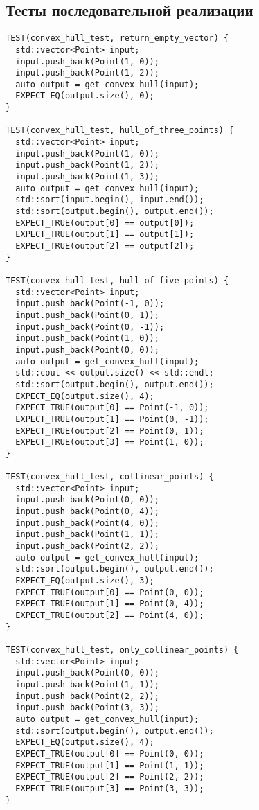 \documentclass[14pt, a4paper]{extarticle}
\begin{document}
\subsection{Тесты последовательной реализации }

\begin{lstlisting}
TEST(convex_hull_test, return_empty_vector) {
  std::vector<Point> input;
  input.push_back(Point(1, 0));
  input.push_back(Point(1, 2));
  auto output = get_convex_hull(input);
  EXPECT_EQ(output.size(), 0);
}

TEST(convex_hull_test, hull_of_three_points) {
  std::vector<Point> input;
  input.push_back(Point(1, 0));
  input.push_back(Point(1, 2));
  input.push_back(Point(1, 3));
  auto output = get_convex_hull(input);
  std::sort(input.begin(), input.end());
  std::sort(output.begin(), output.end());
  EXPECT_TRUE(output[0] == output[0]);
  EXPECT_TRUE(output[1] == output[1]);
  EXPECT_TRUE(output[2] == output[2]);
}

TEST(convex_hull_test, hull_of_five_points) {
  std::vector<Point> input;
  input.push_back(Point(-1, 0));
  input.push_back(Point(0, 1));
  input.push_back(Point(0, -1));
  input.push_back(Point(1, 0));
  input.push_back(Point(0, 0));
  auto output = get_convex_hull(input);
  std::cout << output.size() << std::endl;
  std::sort(output.begin(), output.end());
  EXPECT_EQ(output.size(), 4);
  EXPECT_TRUE(output[0] == Point(-1, 0));
  EXPECT_TRUE(output[1] == Point(0, -1));
  EXPECT_TRUE(output[2] == Point(0, 1));
  EXPECT_TRUE(output[3] == Point(1, 0));
}

TEST(convex_hull_test, collinear_points) {
  std::vector<Point> input;
  input.push_back(Point(0, 0));
  input.push_back(Point(0, 4));
  input.push_back(Point(4, 0));
  input.push_back(Point(1, 1));
  input.push_back(Point(2, 2));
  auto output = get_convex_hull(input);
  std::sort(output.begin(), output.end());
  EXPECT_EQ(output.size(), 3);
  EXPECT_TRUE(output[0] == Point(0, 0));
  EXPECT_TRUE(output[1] == Point(0, 4));
  EXPECT_TRUE(output[2] == Point(4, 0));
}

TEST(convex_hull_test, only_collinear_points) {
  std::vector<Point> input;
  input.push_back(Point(0, 0));
  input.push_back(Point(1, 1));
  input.push_back(Point(2, 2));
  input.push_back(Point(3, 3));
  auto output = get_convex_hull(input);
  std::sort(output.begin(), output.end());
  EXPECT_EQ(output.size(), 4);
  EXPECT_TRUE(output[0] == Point(0, 0));
  EXPECT_TRUE(output[1] == Point(1, 1));
  EXPECT_TRUE(output[2] == Point(2, 2));
  EXPECT_TRUE(output[3] == Point(3, 3));
}

\end{lstlisting}
\end{document}

